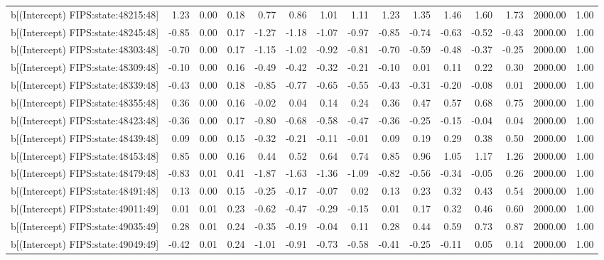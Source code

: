 \begin{table}[ht]
\begin{tabular}{rrrrrrrrrrrrrrr}
  b[(Intercept) FIPS:state:48215:48] & 1.23 & 0.00 & 0.18 & 0.77 & 0.86 & 1.01 & 1.11 & 1.23 & 1.35 & 1.46 & 1.60 & 1.73 & 2000.00 & 1.00 \\ 
  b[(Intercept) FIPS:state:48245:48] & -0.85 & 0.00 & 0.17 & -1.27 & -1.18 & -1.07 & -0.97 & -0.85 & -0.74 & -0.63 & -0.52 & -0.43 & 2000.00 & 1.00 \\ 
  b[(Intercept) FIPS:state:48303:48] & -0.70 & 0.00 & 0.17 & -1.15 & -1.02 & -0.92 & -0.81 & -0.70 & -0.59 & -0.48 & -0.37 & -0.25 & 2000.00 & 1.00 \\ 
  b[(Intercept) FIPS:state:48309:48] & -0.10 & 0.00 & 0.16 & -0.49 & -0.42 & -0.32 & -0.21 & -0.10 & 0.01 & 0.11 & 0.22 & 0.30 & 2000.00 & 1.00 \\ 
  b[(Intercept) FIPS:state:48339:48] & -0.43 & 0.00 & 0.18 & -0.85 & -0.77 & -0.65 & -0.55 & -0.43 & -0.31 & -0.20 & -0.08 & 0.01 & 2000.00 & 1.00 \\ 
  b[(Intercept) FIPS:state:48355:48] & 0.36 & 0.00 & 0.16 & -0.02 & 0.04 & 0.14 & 0.24 & 0.36 & 0.47 & 0.57 & 0.68 & 0.75 & 2000.00 & 1.00 \\ 
  b[(Intercept) FIPS:state:48423:48] & -0.36 & 0.00 & 0.17 & -0.80 & -0.68 & -0.58 & -0.47 & -0.36 & -0.25 & -0.15 & -0.04 & 0.04 & 2000.00 & 1.00 \\ 
  b[(Intercept) FIPS:state:48439:48] & 0.09 & 0.00 & 0.15 & -0.32 & -0.21 & -0.11 & -0.01 & 0.09 & 0.19 & 0.29 & 0.38 & 0.50 & 2000.00 & 1.00 \\ 
  b[(Intercept) FIPS:state:48453:48] & 0.85 & 0.00 & 0.16 & 0.44 & 0.52 & 0.64 & 0.74 & 0.85 & 0.96 & 1.05 & 1.17 & 1.26 & 2000.00 & 1.00 \\ 
  b[(Intercept) FIPS:state:48479:48] & -0.83 & 0.01 & 0.41 & -1.87 & -1.63 & -1.36 & -1.09 & -0.82 & -0.56 & -0.34 & -0.05 & 0.26 & 2000.00 & 1.00 \\ 
  b[(Intercept) FIPS:state:48491:48] & 0.13 & 0.00 & 0.15 & -0.25 & -0.17 & -0.07 & 0.02 & 0.13 & 0.23 & 0.32 & 0.43 & 0.54 & 2000.00 & 1.00 \\ 
  b[(Intercept) FIPS:state:49011:49] & 0.01 & 0.01 & 0.23 & -0.62 & -0.47 & -0.29 & -0.15 & 0.01 & 0.17 & 0.32 & 0.46 & 0.60 & 2000.00 & 1.00 \\ 
  b[(Intercept) FIPS:state:49035:49] & 0.28 & 0.01 & 0.24 & -0.35 & -0.19 & -0.04 & 0.11 & 0.28 & 0.44 & 0.59 & 0.73 & 0.87 & 2000.00 & 1.00 \\ 
  b[(Intercept) FIPS:state:49049:49] & -0.42 & 0.01 & 0.24 & -1.01 & -0.91 & -0.73 & -0.58 & -0.41 & -0.25 & -0.11 & 0.05 & 0.14 & 2000.00 & 1.00 \\ 

\end{tabular}
\end{table}
